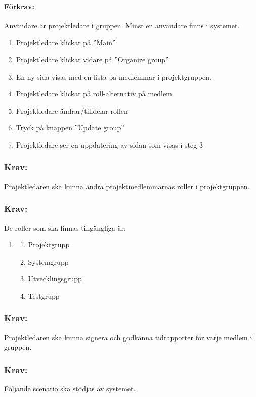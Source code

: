 \documentclass[paper=a4, fontsize=11pt,twoside]{article}
\begin{document}
\paragraph{Förkrav:}
Användare är projektledare i gruppen. Minst en användare finns i systemet.
\begin{enumerate} 
\item Projektledare klickar på ”Main”
\item Projektledare klickar vidare på ”Organize group”
\item En ny sida visas med en lista på medlemmar i projektgruppen.
\item Projektledare klickar på roll-alternativ på medlem
\item Projektledare ändrar/tilldelar rollen
\item Tryck på knappen ”Update group”
\item Projektledare ser en uppdatering av sidan som visas i steg 3
\end{enumerate}

\subsubsection{Krav:}
Projektledaren ska kunna ändra projektmedlemmarnas roller i projektgruppen.

\subsubsection{Krav:}
De roller som ska finnas tillgängliga är:
\begin{enumerate}
\item[]
\begin{enumerate}
\item Projektgrupp
\item Systemgrupp
\item Utvecklingsgrupp
\item Testgrupp
\end{enumerate}
\end{enumerate}

\subsubsection{Krav:}
Projektledaren ska kunna signera och godkänna tidrapporter för varje medlem i gruppen.

\subsubsection{Krav:}
Följande scenario ska stödjas av systemet.
\end{document}
